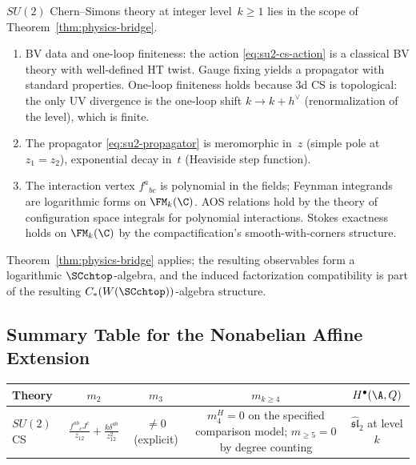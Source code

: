 \begin{proposition}
\label{prop:su2-hypotheses}
$SU(2)$ Chern--Simons theory at integer level~$k \geq 1$ lies in the
scope of Theorem~\ref{thm:physics-bridge}.
\begin{enumerate}[label=\textup{(\roman*)}]
\item BV data and one-loop finiteness: the action
 \eqref{eq:su2-cs-action} is a classical BV theory with well-defined
 HT twist. Gauge fixing yields a propagator with standard properties.
 One-loop finiteness holds because 3d CS is topological: the only
 UV divergence is the one-loop shift $k \to k + h^\vee$
 (renormalization of the level), which is finite.
\item The propagator \eqref{eq:su2-propagator} is meromorphic in~$z$
 (simple pole at $z_1 = z_2$), exponential decay in~$t$
 (Heaviside step function).
\item The interaction vertex $f^a{}_{bc}$
 is polynomial in the fields; Feynman integrands are
 logarithmic forms on $\FM_k(\C)$. AOS relations hold by
 the theory of configuration space integrals for
 polynomial interactions. Stokes exactness holds on
 $\FM_k(\C)$ by the compactification's smooth-with-corners
 structure.
\end{enumerate}
Theorem~\ref{thm:physics-bridge} applies; the resulting
observables form a logarithmic $\SCchtop$-algebra, and the induced
factorization compatibility is part of the resulting
$C_\ast(W(\SCchtop))$-algebra structure.
\end{proposition}

\subsection{Summary Table for the Nonabelian Affine Extension}

\begin{center}
\begin{tabular}{|l|c|c|c|c|}
\hline
\textbf{Theory} & $m_2$ & $m_3$ & $m_{k \geq 4}$ & $H^\bullet(\A, Q)$ \\
\hline
$SU(2)$ CS & $\frac{f^{ab}{}_c J^c}{z_{12}} + \frac{k\delta^{ab}}{z_{12}^2}$ & $\neq 0$ (explicit) & $m_4^H = 0$ on the specified comparison model; $m_{\geq 5} = 0$ by degree counting & $\widehat{\mathfrak{sl}}_2$ at level $k$ \\
\hline
\end{tabular}
\end{center}
